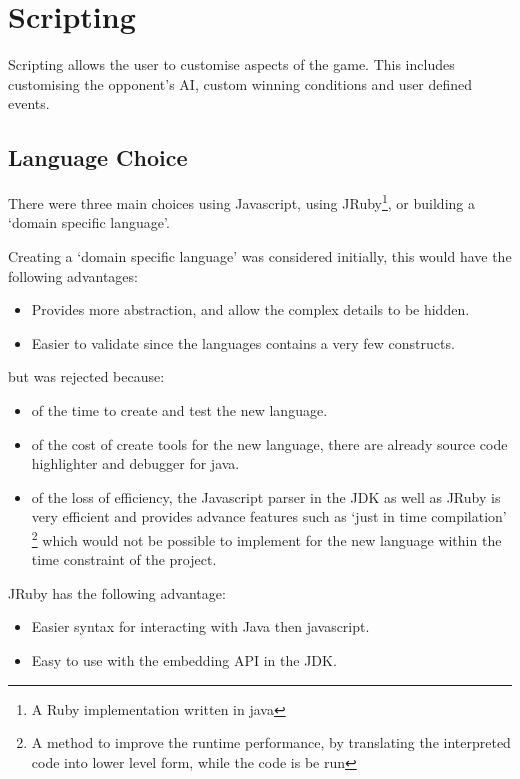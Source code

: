 \section{Scripting}
\label{sec:Scripting}

Scripting allows the user to customise aspects of the game. This includes customising the opponent's AI, custom winning conditions and user defined events. 

\subsection{Language Choice}

There were three main choices using Javascript, using JRuby\footnote{A Ruby implementation written in java}, or building a `domain specific language'.

Creating a `domain specific language' was considered initially, this would have the following advantages:
\begin{itemize}
	\item Provides more abstraction, and allow the complex details to be hidden.
	\item Easier to validate since the languages contains a very few constructs.  
\end{itemize}

\noindent but was rejected because:

\begin{itemize}
	\item of the time to create and test the new language.
	\item of the cost of create tools for the new language, there are already source code highlighter and debugger for java.
	\item of the loss of efficiency, the Javascript parser in the JDK as well as JRuby is very efficient and provides advance features such as `just in time compilation' 
	\footnote{A method to improve the runtime performance, by translating the interpreted code into lower level form, while the code is be run
	}  
which would not be possible to implement for the new language within the time constraint of the project.
\end{itemize}

\noindent JRuby has the following advantage:
\begin{itemize}
	\item Easier syntax for interacting with Java then javascript.
	\item Easy to use with the embedding API in the JDK.
\end{itemize}

